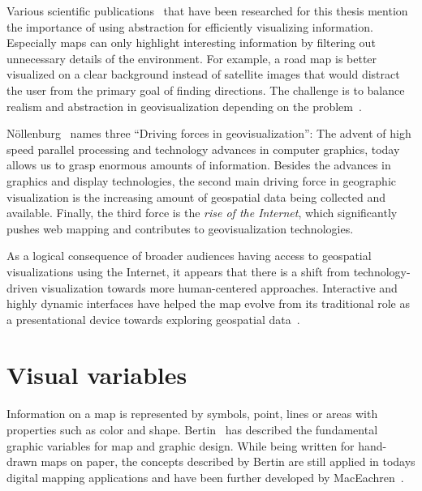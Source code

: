 Various scientific publications~\cite{phillips82clutter, MACEACHREN90apattern, keim2001vis, harvey2008primer, ellis08clutter, Delort10vis, noellenburg11geovis} that have been researched for this thesis mention the importance of using abstraction for efficiently visualizing information. Especially maps can only highlight interesting information by filtering out unnecessary details of the environment. For example, a road map is better visualized on a clear background instead of satellite images that would distract the user from the primary goal of finding directions. The challenge is to balance realism and abstraction in geovisualization depending on the problem~\cite{noellenburg11geovis}.



N\"{o}llenburg~\cite{noellenburg11geovis} names three ``Driving forces in geovisualization'': The advent of high speed parallel processing and technology advances in computer graphics, today allows us to grasp enormous amounts of information. Besides the advances in graphics and display technologies, the second main driving force in geographic visualization is the increasing amount of geospatial data being collected and available. Finally, the third force is the \textit{rise of the Internet}, which significantly pushes web mapping and contributes to geovisualization technologies.

As a logical consequence of broader audiences having access to geospatial visualizations using the Internet, it appears that there is a shift from technology-driven visualization towards more human-centered approaches. Interactive and highly dynamic interfaces have helped the map evolve from its traditional role as a presentational device towards exploring geospatial data~\cite{noellenburg11geovis, vislecture}.


\section{Visual variables}
\label{chapter:vis-variables}


Information on a map is represented by symbols, point, lines or areas with properties such as color and shape. Bertin~\cite{bertin67graphics, bertin83graphics} has described the fundamental graphic variables for map and graphic design. While being written for hand-drawn maps on paper, the concepts described by Bertin are still applied in todays digital mapping applications and have been further developed by MacEachren~\cite{MacEachren95maps}.

